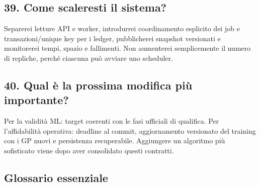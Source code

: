 \documentclass[11pt,a4paper]{article}
\begin{document}
\subsection{39. Come scaleresti il sistema?}\label{come-scaleresti-il-sistema}

Separerei letture API e worker, introdurrei coordinamento esplicito dei job e transazioni/unique key per i ledger, pubblicherei snapshot versionati e monitorerei tempi, spazio e fallimenti. Non aumenterei semplicemente il numero di repliche, perché ciascuna può avviare uno scheduler.

\subsection{40. Qual è la prossima modifica più importante?}\label{qual-uxe8-la-prossima-modifica-piuxf9-importante}

Per la validità ML: target coerenti con le fasi ufficiali di qualifica. Per l'affidabilità operativa: deadline al commit, aggiornamento versionato del training con i GP nuovi e persistenza recuperabile. Aggiungere un algoritmo più sofisticato viene dopo aver consolidato questi contratti.

\subsection{Glossario essenziale}\label{glossario-essenziale}
\end{document}
